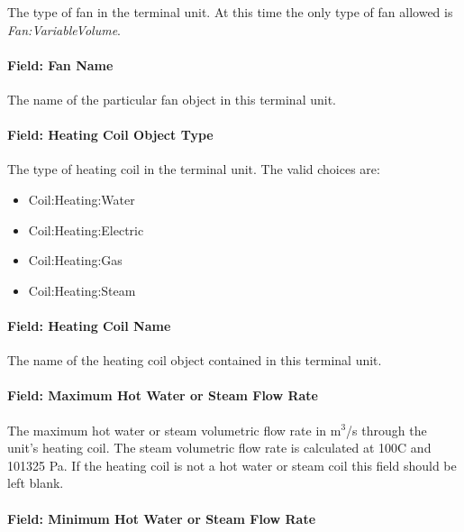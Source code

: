 The type of fan in the terminal unit. At this time the only type of fan allowed is \emph{Fan:VariableVolume}.

\paragraph{Field: Fan Name}\label{field-fan-name}

The name of the particular fan object in this terminal unit.

\paragraph{Field: Heating Coil Object Type}\label{field-heating-coil-object-type}

The type of heating coil in the terminal unit. The valid choices are:

\begin{itemize}
\item
  Coil:Heating:Water
\item
  Coil:Heating:Electric
\item
  Coil:Heating:Gas
\item
  Coil:Heating:Steam
\end{itemize}

\paragraph{Field: Heating Coil Name}\label{field-heating-coil-name}

The name of the heating coil object contained in this terminal unit.

\paragraph{Field: Maximum Hot Water or Steam Flow Rate}\label{field-maximum-hot-water-or-steam-flow-rate-2}

The maximum hot water or steam volumetric flow rate in m\(^{3}\)/s through the unit's heating coil. The steam volumetric flow rate is calculated at 100C and 101325 Pa. If the heating coil is not a hot water or steam coil this field should be left blank.

\paragraph{Field: Minimum Hot Water or Steam Flow Rate}\label{field-minimum-hot-water-or-steam-flow-rate-2}

